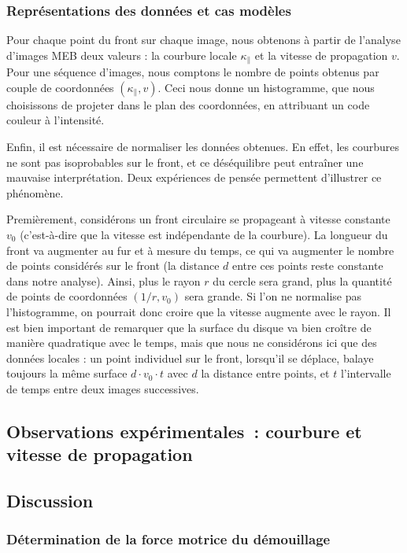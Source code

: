 {{			\subsubsection{Représentations des données et cas modèles}
Pour chaque point du front sur chaque image, nous obtenons à partir de l'analyse d'images MEB deux valeurs : la courbure locale $\kappa_\parallel$ et la vitesse de propagation $v$. Pour une séquence d’images, nous comptons le nombre de points obtenus par couple de coordonnées $(\kappa_\parallel,v)$. Ceci nous donne un histogramme, que nous choisissons de projeter dans le plan des coordonnées, en attribuant un code couleur à l’intensité.\par 
Enfin, il est nécessaire de normaliser les données obtenues. En effet, les courbures ne sont pas isoprobables sur le front, et ce déséquilibre peut entraîner une mauvaise interprétation. Deux expériences de pensée permettent d’illustrer ce phénomène.\par 
Premièrement, considérons un front circulaire se propageant à vitesse constante $v_0$ (c’est-à-dire que la vitesse est indépendante de la courbure). La longueur du front va augmenter au fur et à mesure du temps, ce qui va augmenter le nombre de points considérés sur le front (la distance $d$ entre ces points reste constante dans notre analyse). Ainsi, plus le rayon $r$ du cercle sera grand, plus la quantité de points de coordonnées $(1/r,v_0)$ sera grande. Si l’on ne normalise pas l’histogramme, on pourrait donc croire que la vitesse augmente avec le rayon. Il est bien important de remarquer que la surface du disque va bien croître de manière quadratique avec le temps, mais que nous ne considérons ici que des données locales : un point individuel sur le front, lorsqu’il se déplace, balaye toujours la même surface $d \cdot v_0 \cdot t$ avec $d$ la distance entre points, et $t$ l’intervalle de temps entre deux images successives.\par
		\subsection{Observations expérimentales~: courbure et vitesse de propagation}
		\subsection{Discussion}
			\subsubsection{Détermination de la force motrice du démouillage}
}}
